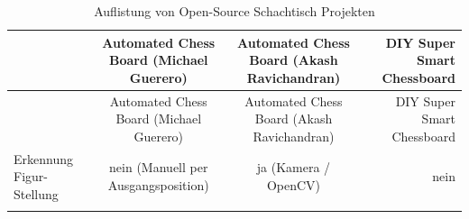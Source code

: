 \begin{longtable}[]{@{}lccr@{}}
\caption{Auflistung von Open-Source Schachtisch Projekten
\label{oschesstables}}\tabularnewline
\toprule
\begin{minipage}[b]{0.19\columnwidth}\raggedright
\strut
\end{minipage} & \begin{minipage}[b]{0.25\columnwidth}\centering
Automated Chess Board (Michael Guerero) \cite{actproject1}\strut
\end{minipage} & \begin{minipage}[b]{0.26\columnwidth}\centering
Automated Chess Board (Akash Ravichandran) \cite{actproject2}\strut
\end{minipage} & \begin{minipage}[b]{0.19\columnwidth}\raggedleft
DIY Super Smart Chessboard \cite{actproject3}\strut
\end{minipage}\tabularnewline
\midrule
\endfirsthead
\toprule
\begin{minipage}[b]{0.19\columnwidth}\raggedright
\strut
\end{minipage} & \begin{minipage}[b]{0.25\columnwidth}\centering
Automated Chess Board (Michael Guerero) \cite{actproject1}\strut
\end{minipage} & \begin{minipage}[b]{0.26\columnwidth}\centering
Automated Chess Board (Akash Ravichandran) \cite{actproject2}\strut
\end{minipage} & \begin{minipage}[b]{0.19\columnwidth}\raggedleft
DIY Super Smart Chessboard \cite{actproject3}\strut
\end{minipage}\tabularnewline
\midrule
\endhead
\begin{minipage}[t]{0.19\columnwidth}\raggedright
Erkennung Figur-Stellung\strut
\end{minipage} & \begin{minipage}[t]{0.25\columnwidth}\centering
nein (Manuell per Ausgangsposition)\strut
\end{minipage} & \begin{minipage}[t]{0.26\columnwidth}\centering
ja (Kamera / OpenCV)\strut
\end{minipage} & \begin{minipage}[t]{0.19\columnwidth}\raggedleft
nein\strut
\end{minipage}\tabularnewline
\begin{minipage}[t]{0.19\columnwidth}\raggedright

\end{minipage}
\end{longtable}
